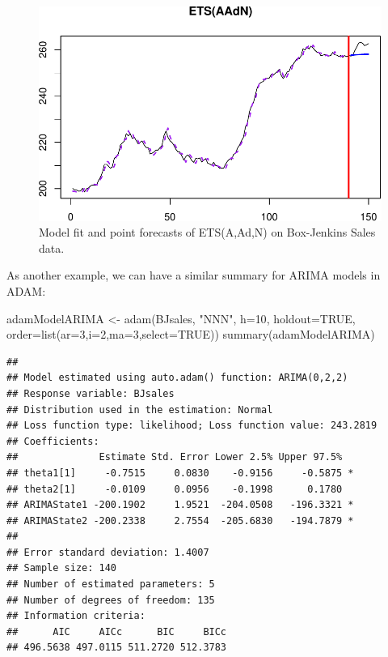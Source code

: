 \documentclass[
]{book}
\newenvironment{Shaded}{\begin{snugshade}}{\end{snugshade}}
\newcommand{\AttributeTok}[1]{\textcolor[rgb]{0.77,0.63,0.00}{#1}}
\newcommand{\ConstantTok}[1]{\textcolor[rgb]{0.00,0.00,0.00}{#1}}
\newcommand{\DecValTok}[1]{\textcolor[rgb]{0.00,0.00,0.81}{#1}}
\newcommand{\FunctionTok}[1]{\textcolor[rgb]{0.00,0.00,0.00}{#1}}
\newcommand{\NormalTok}[1]{#1}
\newcommand{\OtherTok}[1]{\textcolor[rgb]{0.56,0.35,0.01}{#1}}
\newcommand{\StringTok}[1]{\textcolor[rgb]{0.31,0.60,0.02}{#1}}
\theoremstyle{definition}
\theoremstyle{definition}
\theoremstyle{definition}
\theoremstyle{definition}
\theoremstyle{remark}
\begin{document}
\begin{figure}
\centering
\includegraphics{Svetunkov--2022----ADAM_files/figure-latex/adamModelBJAAdN-1.pdf}
\caption{\label{fig:adamModelBJAAdN}Model fit and point forecasts of ETS(A,Ad,N) on Box-Jenkins Sales data.}
\end{figure}

As another example, we can have a similar summary for ARIMA models in ADAM:

\begin{Shaded}
\begin{Highlighting}[]
\NormalTok{adamModelARIMA }\OtherTok{\textless{}{-}} \FunctionTok{adam}\NormalTok{(BJsales, }\StringTok{"NNN"}\NormalTok{, }\AttributeTok{h=}\DecValTok{10}\NormalTok{, }\AttributeTok{holdout=}\ConstantTok{TRUE}\NormalTok{,}
                       \AttributeTok{order=}\FunctionTok{list}\NormalTok{(}\AttributeTok{ar=}\DecValTok{3}\NormalTok{,}\AttributeTok{i=}\DecValTok{2}\NormalTok{,}\AttributeTok{ma=}\DecValTok{3}\NormalTok{,}\AttributeTok{select=}\ConstantTok{TRUE}\NormalTok{))}
\FunctionTok{summary}\NormalTok{(adamModelARIMA)}
\end{Highlighting}
\end{Shaded}

\begin{verbatim}
## 
## Model estimated using auto.adam() function: ARIMA(0,2,2)
## Response variable: BJsales
## Distribution used in the estimation: Normal
## Loss function type: likelihood; Loss function value: 243.2819
## Coefficients:
##              Estimate Std. Error Lower 2.5% Upper 97.5%  
## theta1[1]     -0.7515     0.0830    -0.9156     -0.5875 *
## theta2[1]     -0.0109     0.0956    -0.1998      0.1780  
## ARIMAState1 -200.1902     1.9521  -204.0508   -196.3321 *
## ARIMAState2 -200.2338     2.7554  -205.6830   -194.7879 *
## 
## Error standard deviation: 1.4007
## Sample size: 140
## Number of estimated parameters: 5
## Number of degrees of freedom: 135
## Information criteria:
##      AIC     AICc      BIC     BICc 
## 496.5638 497.0115 511.2720 512.3783
\end{verbatim}
\end{document}
